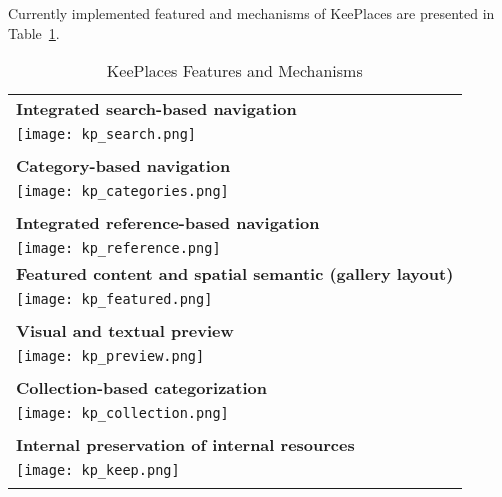 \label{chapter:appendix_keeplaces}
Currently implemented featured and mechanisms of KeePlaces are presented in Table~\ref{table:keeplaces}.
\begin{longtable}{|p{0.90\linewidth}|}

\caption{KeePlaces Features and Mechanisms}
\label{table:keeplaces}\\

\hline
\textbf{Integrated search-based navigation}         \\
\texttt{[image: kp\_search.png]}\\
\\
\textbf{Category-based navigation}         \\
\texttt{[image: kp\_categories.png]}\\
\\

\textbf{Integrated reference-based navigation}         \\
\texttt{[image: kp\_reference.png]}\\
\hline
\pagebreak
\hline
\textbf{Featured content and spatial semantic (gallery layout)}         \\
\texttt{[image: kp\_featured.png]}\\
\\

\textbf{Visual and textual preview}         \\
\texttt{[image: kp\_preview.png]}\\
\\
\hline
\pagebreak
\hline
\textbf{Collection-based categorization}         \\
\texttt{[image: kp\_collection.png]}\\
\\

\textbf{Internal preservation of internal resources}         \\
\texttt{[image: kp\_keep.png]}\\
\\

\hline
\end{longtable}
